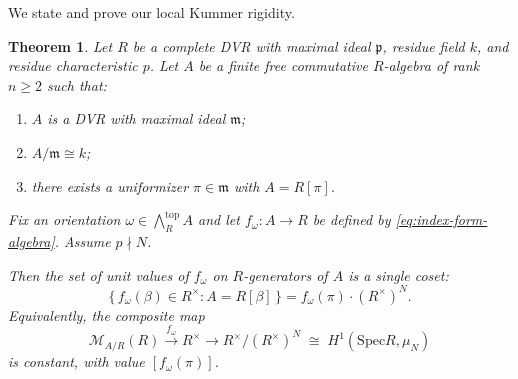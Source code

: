 \documentclass[11pt,letterpaper]{amsart}
\newcommand{\Spec}{\mathrm{Spec}}
\newcommand{\wedgeTop}{\bigwedge\nolimits^{\mathrm{top}}}
\newcommand{\cM}{\mathcal{M}}
\theoremstyle{plain}
\newtheorem{theorem}{Theorem}[section]
\theoremstyle{definition}
\theoremstyle{remark}
\theoremstyle{plain}
\begin{document}
We state and prove our local Kummer rigidity.
\begin{theorem}\label{thm:localcoset}
Let $R$ be a complete DVR with maximal ideal $\mathfrak p$, residue field $k$, and residue characteristic $p$.
Let $A$ be a finite free commutative $R$-algebra of rank $n\ge 2$ such that:
\begin{enumerate}[label=\textup{(\roman*)},leftmargin=*]
\item $A$ is a DVR with maximal ideal $\mathfrak m$;
\item $A/\mathfrak m \cong k$;
\item there exists a uniformizer $\pi\in\mathfrak m$ with $A=R[\pi]$.
\end{enumerate}
Fix an orientation $\omega\in \wedgeTop_R A$ and let $f_\omega:A\to R$ be defined by \eqref{eq:index-form-algebra}.
Assume $p\nmid N$.

Then the set of unit values of $f_\omega$ on $R$-generators of $A$ is a single coset:
\[
\{\, f_\omega(\beta)\in R^\times : A=R[\beta] \,\}
=
f_\omega(\pi)\cdot (R^\times)^N.
\]
Equivalently, the composite map
\[
\cM_{A/R}(R)\xrightarrow{f_\omega} R^\times \longrightarrow R^\times/(R^\times)^N \;\cong\; H^1(\Spec R,\mu_N)
\]
is constant, with value $[f_\omega(\pi)]$.
\end{theorem}
\end{document}
